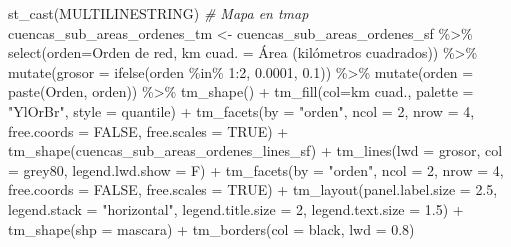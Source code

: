\documentclass[spanish]{article}
\newenvironment{Shaded}{\begin{snugshade}}{\end{snugshade}}
\newcommand{\AttributeTok}[1]{\textcolor[rgb]{0.77,0.63,0.00}{#1}}
\newcommand{\CommentTok}[1]{\textcolor[rgb]{0.56,0.35,0.01}{\textit{#1}}}
\newcommand{\ConstantTok}[1]{\textcolor[rgb]{0.00,0.00,0.00}{#1}}
\newcommand{\DecValTok}[1]{\textcolor[rgb]{0.00,0.00,0.81}{#1}}
\newcommand{\FloatTok}[1]{\textcolor[rgb]{0.00,0.00,0.81}{#1}}
\newcommand{\FunctionTok}[1]{\textcolor[rgb]{0.00,0.00,0.00}{#1}}
\newcommand{\NormalTok}[1]{#1}
\newcommand{\OtherTok}[1]{\textcolor[rgb]{0.56,0.35,0.01}{#1}}
\newcommand{\SpecialCharTok}[1]{\textcolor[rgb]{0.00,0.00,0.00}{#1}}
\newcommand{\StringTok}[1]{\textcolor[rgb]{0.31,0.60,0.02}{#1}}
\begin{document}
\begin{Shaded}
\begin{Highlighting}[]
  \FunctionTok{st\_cast}\NormalTok{(}\StringTok{\textquotesingle{}MULTILINESTRING\textquotesingle{}}\NormalTok{)}
\CommentTok{\# Mapa en tmap}
\NormalTok{cuencas\_sub\_areas\_ordenes\_tm }\OtherTok{\textless{}{-}}\NormalTok{ cuencas\_sub\_areas\_ordenes\_sf }\SpecialCharTok{\%\textgreater{}\%}
  \FunctionTok{select}\NormalTok{(}\AttributeTok{orden=}\StringTok{\textasciigrave{}}\AttributeTok{Orden de red}\StringTok{\textasciigrave{}}\NormalTok{, }\StringTok{\textasciigrave{}}\AttributeTok{km cuad.}\StringTok{\textasciigrave{}} \OtherTok{=} \StringTok{\textasciigrave{}}\AttributeTok{Área (kilómetros cuadrados)}\StringTok{\textasciigrave{}}\NormalTok{) }\SpecialCharTok{\%\textgreater{}\%} 
  \FunctionTok{mutate}\NormalTok{(}\AttributeTok{grosor =} \FunctionTok{ifelse}\NormalTok{(orden }\SpecialCharTok{\%in\%} \DecValTok{1}\SpecialCharTok{:}\DecValTok{2}\NormalTok{, }\FloatTok{0.0001}\NormalTok{, }\FloatTok{0.1}\NormalTok{)) }\SpecialCharTok{\%\textgreater{}\%} 
  \FunctionTok{mutate}\NormalTok{(}\AttributeTok{orden =} \FunctionTok{paste}\NormalTok{(}\StringTok{\textquotesingle{}Orden\textquotesingle{}}\NormalTok{, orden)) }\SpecialCharTok{\%\textgreater{}\%}
  \FunctionTok{tm\_shape}\NormalTok{() }\SpecialCharTok{+}
  \FunctionTok{tm\_fill}\NormalTok{(}\AttributeTok{col=}\StringTok{\textquotesingle{}km cuad.\textquotesingle{}}\NormalTok{, }\AttributeTok{palette =} \StringTok{"YlOrBr"}\NormalTok{, }\AttributeTok{style =} \StringTok{\textquotesingle{}quantile\textquotesingle{}}\NormalTok{) }\SpecialCharTok{+}
  \FunctionTok{tm\_facets}\NormalTok{(}\AttributeTok{by =} \StringTok{"orden"}\NormalTok{, }\AttributeTok{ncol =} \DecValTok{2}\NormalTok{, }\AttributeTok{nrow =} \DecValTok{4}\NormalTok{, }\AttributeTok{free.coords =} \ConstantTok{FALSE}\NormalTok{, }\AttributeTok{free.scales =} \ConstantTok{TRUE}\NormalTok{) }\SpecialCharTok{+}
  \FunctionTok{tm\_shape}\NormalTok{(cuencas\_sub\_areas\_ordenes\_lines\_sf) }\SpecialCharTok{+}
  \FunctionTok{tm\_lines}\NormalTok{(}\AttributeTok{lwd =} \StringTok{\textquotesingle{}grosor\textquotesingle{}}\NormalTok{, }\AttributeTok{col =} \StringTok{\textquotesingle{}grey80\textquotesingle{}}\NormalTok{, }\AttributeTok{legend.lwd.show =}\NormalTok{ F) }\SpecialCharTok{+}
  \FunctionTok{tm\_facets}\NormalTok{(}\AttributeTok{by =} \StringTok{"orden"}\NormalTok{, }\AttributeTok{ncol =} \DecValTok{2}\NormalTok{, }\AttributeTok{nrow =} \DecValTok{4}\NormalTok{, }\AttributeTok{free.coords =} \ConstantTok{FALSE}\NormalTok{, }\AttributeTok{free.scales =} \ConstantTok{TRUE}\NormalTok{) }\SpecialCharTok{+}
  \FunctionTok{tm\_layout}\NormalTok{(}\AttributeTok{panel.label.size =} \FloatTok{2.5}\NormalTok{, }\AttributeTok{legend.stack =} \StringTok{"horizontal"}\NormalTok{,}
            \AttributeTok{legend.title.size =} \DecValTok{2}\NormalTok{, }\AttributeTok{legend.text.size =} \FloatTok{1.5}\NormalTok{) }\SpecialCharTok{+} 
  \FunctionTok{tm\_shape}\NormalTok{(}\AttributeTok{shp =}\NormalTok{ mascara) }\SpecialCharTok{+}
  \FunctionTok{tm\_borders}\NormalTok{(}\AttributeTok{col =} \StringTok{\textquotesingle{}black\textquotesingle{}}\NormalTok{, }\AttributeTok{lwd =} \FloatTok{0.8}\NormalTok{)}
\end{Highlighting}
\end{Shaded}
\end{document}
